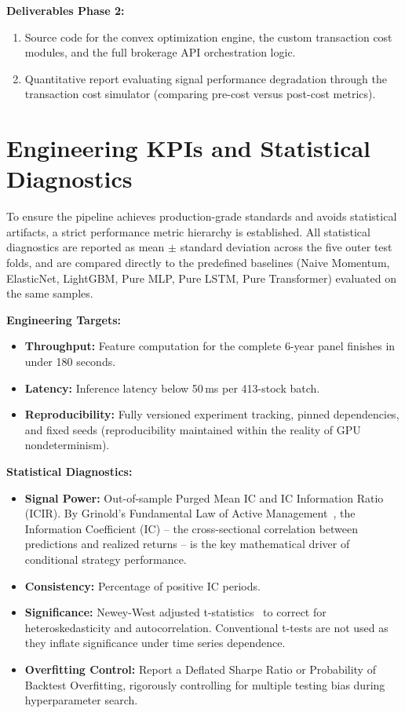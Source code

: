 \documentclass[twoside,final]{hcmut-report}
\begin{document}
\vspace{0.5em}
\textbf{Deliverables Phase 2:}
\begin{enumerate}
  \item Source code for the convex optimization engine, the custom transaction cost modules, and the full brokerage API orchestration logic.
  \item Quantitative report evaluating signal performance degradation through the transaction cost simulator (comparing pre-cost versus post-cost metrics).
\end{enumerate}

\section{Engineering KPIs and Statistical Diagnostics}

To ensure the pipeline achieves production-grade standards and avoids statistical artifacts, a strict performance metric hierarchy is established. All statistical diagnostics are reported as mean $\pm$ standard deviation across the five outer test folds, and are compared directly to the predefined baselines (Naive Momentum, ElasticNet, LightGBM, Pure MLP, Pure LSTM, Pure Transformer) evaluated on the same samples.

\textbf{Engineering Targets:}
\begin{itemize}
  \item \textbf{Throughput:} Feature computation for the complete 6-year panel finishes in under 180 seconds.
  \item \textbf{Latency:} Inference latency below 50\,ms per 413-stock batch.
  \item \textbf{Reproducibility:} Fully versioned experiment tracking, pinned dependencies, and fixed seeds (reproducibility maintained within the reality of GPU nondeterminism).
\end{itemize}

\textbf{Statistical Diagnostics:}
\begin{itemize}
  \item \textbf{Signal Power:} Out-of-sample Purged Mean IC and IC Information Ratio (ICIR). By Grinold's Fundamental Law of Active Management~\cite{Grinold1989}, the Information Coefficient (IC) -- the cross-sectional correlation between predictions and realized returns -- is the key mathematical driver of conditional strategy performance.
  \item \textbf{Consistency:} Percentage of positive IC periods.
  \item \textbf{Significance:} Newey-West adjusted t-statistics~\cite{NeweyWest1987} to correct for heteroskedasticity and autocorrelation. Conventional t-tests are not used as they inflate significance under time series dependence.
  \item \textbf{Overfitting Control:} Report a Deflated Sharpe Ratio or Probability of Backtest Overfitting, rigorously controlling for multiple testing bias during hyperparameter search.
\end{itemize}
\end{document}
